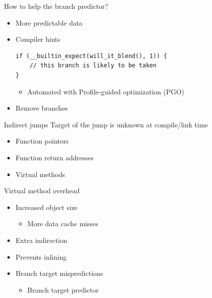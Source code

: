 \documentclass[hyperref={pdfpagelabels=false}]{beamer}
\newcommand{\textapprox}{\raisebox{0.5ex}{\texttildelow}}
\begin{document}
\begin{frame}[fragile]{How to help the branch predictor?}
	\begin{itemize}
		\item More predictable data
		\item<2-> Compiler hints
		\begin{tcolorbox}
		\begin{verbatim}
if (__builtin_expect(will_it_blend(), 1)) {
	// this branch is likely to be taken
}
		\end{verbatim}
		\end{tcolorbox}
		\begin{itemize}
			\item<3-> Automated with Profile-guided optimization (PGO)
		\end{itemize}
		\item<4> Remove branches
	\end{itemize}
\end{frame}
%		
\begin{frame}{Indirect jumps}
	Target of the jump is unknown at compile/link time
	\begin{itemize}
		\item<2-> Function pointers
		\item<3-> Function return addresses
		\item<4> Virtual methods
	\end{itemize}
\end{frame}
\begin{frame}{Virtual method overhead}
	\begin{itemize}
		\item Increased object size
			\begin{itemize}
				\item More data cache misses
			\end{itemize}
		\item<2-> Extra indirection
		\item<3-> Prevents inlining
		\item<4-> Branch target mispredictions
			\begin{itemize}
				\item<5> Branch target predictor
			\end{itemize}
	\end{itemize}
\end{frame}
\end{document}
